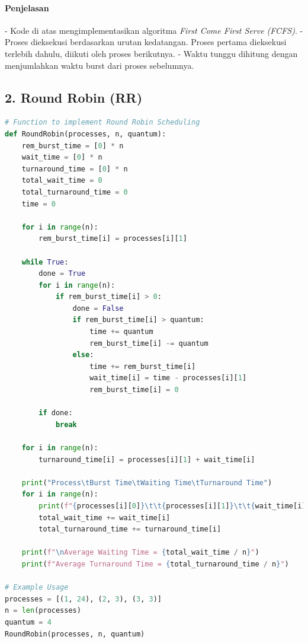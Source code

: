 \documentclass[12pt]{article}
\begin{document}
\paragraph{Penjelasan}
- Kode di atas mengimplementasikan algoritma \textit{First Come First Serve (FCFS)}.
- Proses dieksekusi berdasarkan urutan kedatangan. Proses pertama dieksekusi terlebih dahulu, diikuti oleh proses berikutnya.
- Waktu tunggu dihitung dengan menjumlahkan waktu burst dari proses sebelumnya.

\subsection*{2. Round Robin (RR)}

\begin{lstlisting}[language=Python, caption=Round Robin Algorithm]
# Function to implement Round Robin Scheduling
def RoundRobin(processes, n, quantum):
    rem_burst_time = [0] * n
    wait_time = [0] * n
    turnaround_time = [0] * n
    total_wait_time = 0
    total_turnaround_time = 0
    time = 0
    
    for i in range(n):
        rem_burst_time[i] = processes[i][1]
    
    while True:
        done = True
        for i in range(n):
            if rem_burst_time[i] > 0:
                done = False
                if rem_burst_time[i] > quantum:
                    time += quantum
                    rem_burst_time[i] -= quantum
                else:
                    time += rem_burst_time[i]
                    wait_time[i] = time - processes[i][1]
                    rem_burst_time[i] = 0
        
        if done:
            break
    
    for i in range(n):
        turnaround_time[i] = processes[i][1] + wait_time[i]
    
    print("Process\tBurst Time\tWaiting Time\tTurnaround Time")
    for i in range(n):
        print(f"{processes[i][0]}\t\t{processes[i][1]}\t\t{wait_time[i]}\t\t{turnaround_time[i]}")
        total_wait_time += wait_time[i]
        total_turnaround_time += turnaround_time[i]
    
    print(f"\nAverage Waiting Time = {total_wait_time / n}")
    print(f"Average Turnaround Time = {total_turnaround_time / n}")

# Example Usage
processes = [(1, 24), (2, 3), (3, 3)]
n = len(processes)
quantum = 4
RoundRobin(processes, n, quantum)
\end{lstlisting}
\end{document}
